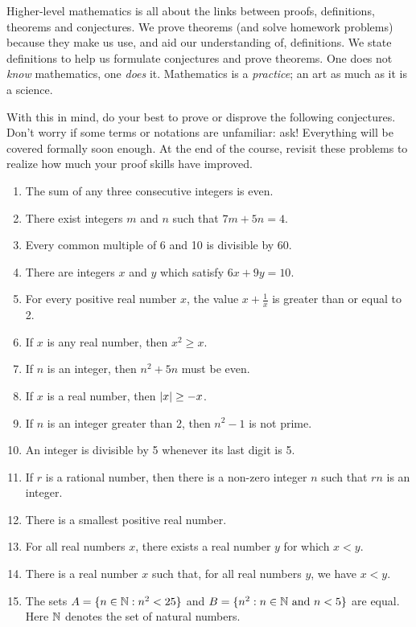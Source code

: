 \goodbreak




Higher-level mathematics is all about the links between proofs, definitions, theorems and conjectures. We prove theorems (and solve homework problems) because they make us use, and aid our understanding of, definitions. We state definitions to help us formulate conjectures and prove theorems. One does not \emph{know} mathematics, one \emph{does} it. Mathematics is a \emph{practice}; an art as much as it is a science.\medbreak

With this in mind, do your best to prove or disprove the following conjectures. Don't worry if some terms or notations are unfamiliar: ask! Everything will be covered formally soon enough. At the end of the course, revisit these problems to realize how much your proof skills have improved. 

\begin{enumerate}
	\item The sum of any three consecutive integers is even.
	\item There exist integers $m$ and $n$ such that $7m+5n =4$.
	\item Every common multiple of 6 and 10 is divisible by 60.
	\item There are integers $x$ and $y$ which satisfy $6x+9y =10$.
	\item For every positive real number $x$, the value $x+\frac 1x$ is greater than or equal to 2.
	\item If $x$ is any real number, then $x^2\ge x$.
	\item If $n$ is an integer, then $n^2+5n$ must be even.
	\item If $x$ is a real number, then $\left| x\right|\ge -x$.
	\item If $n$ is an integer greater than 2, then $n^2-1$ is not prime.
	\item An integer is divisible by 5 whenever its last digit is 5.
	\item If $r$ is a rational number, then there is a non-zero integer $n$ such that $rn$ is an integer.
	\item There is a smallest positive real number.
	\item For all real numbers $x$, there exists a real number $y$ for which $x<y$.
	\item There is a real number $x$ such that, for all real numbers $y$, we have $x<y$.
	\item The sets $A=\{n\in\mathbb{N}:n^2<25\}$ and $B=\{n^2:n\in\mathbb{N}\text{ and }n<5\}$ are equal. Here $\mathbb{N}$ denotes the set of natural numbers.
\end{enumerate}



